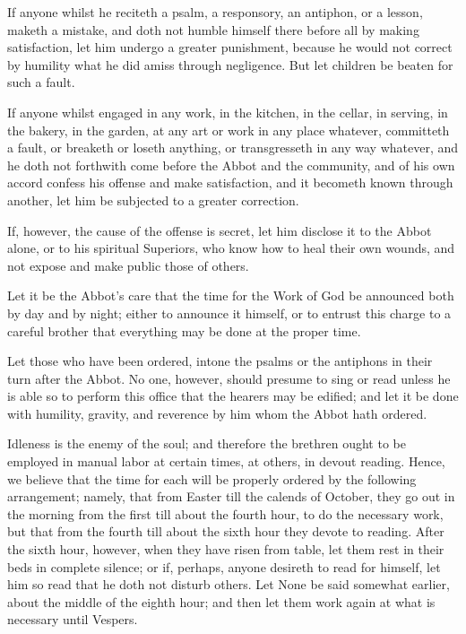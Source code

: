 
If anyone whilst he reciteth a psalm, a responsory, an antiphon, or a lesson, maketh a mistake, and doth not humble himself there before all by making satisfaction, let him undergo a greater punishment, because he would not correct by humility what he did amiss through negligence. But let children be beaten for such a fault.


If anyone whilst engaged in any work, in the kitchen, in the cellar, in serving, in the bakery, in the garden, at any art or work in any place whatever, committeth a fault, or breaketh or loseth anything, or transgresseth in any way whatever, and he doth not forthwith come before the Abbot and the community, and of his own accord confess his offense and make satisfaction, and it becometh known through another, let him be subjected to a greater correction.

If, however, the cause of the offense is secret, let him disclose it to the Abbot alone, or to his spiritual Superiors, who know how to heal their own wounds, and not expose and make public those of others.


Let it be the Abbot's care that the time for the Work of God be announced both by day and by night; either to announce it himself, or to entrust this charge to a careful brother that everything may be done at the proper time.

Let those who have been ordered, intone the psalms or the antiphons in their turn after the Abbot. No one, however, should presume to sing or read unless he is able so to perform this office that the hearers may be edified; and let it be done with humility, gravity, and reverence by him whom the Abbot hath ordered.


Idleness is the enemy of the soul; and therefore the brethren ought to be employed in manual labor at certain times, at others, in devout reading. Hence, we believe that the time for each will be properly ordered by the following arrangement; namely, that from Easter till the calends of October, they go out in the morning from the first till about the fourth hour, to do the necessary work, but that from the fourth till about the sixth hour they devote to reading. After the sixth hour, however, when they have risen from table, let them rest in their beds in complete silence; or if, perhaps, anyone desireth to read for himself, let him so read that he doth not disturb others. Let None be said somewhat earlier, about the middle of the eighth hour; and then let them work again at what is necessary until Vespers.

